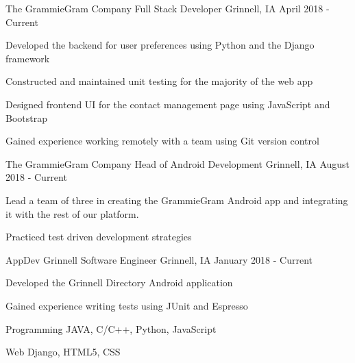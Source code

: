 \documentclass[11pt, a4paper]{awesome-cv}
\begin{document}
\begin{cventries}
  \cventry
    {The GrammieGram Company}
    {Full Stack Developer}
    {Grinnell, IA}
    {April 2018 - Current}
    {
      \begin{cvitems}
        \item {Developed the backend for user preferences using Python and the Django framework}
        \item {Constructed and maintained unit testing for the majority of the web app}
        \item {Designed frontend UI for the contact management page using JavaScript and Bootstrap}
        \item {Gained experience working remotely with a team using Git version control}
      \end{cvitems}
    }

  \cventry
    {The GrammieGram Company}
    {Head of Android Development}
    {Grinnell, IA}
    {August 2018 - Current}
    {
      \begin{cvitems}
        \item {Lead a team of three in creating the GrammieGram Android app and integrating it with the rest of our platform.}
	\item {Practiced test driven development strategies}
      \end{cvitems}
    }

  \cventry
    {AppDev Grinnell}
    {Software Engineer}
    {Grinnell, IA}
    {January 2018 - Current}
    {
      \begin{cvitems}
        \item {Developed the Grinnell Directory Android application}
	\item {Gained experience writing tests using JUnit and Espresso}
      \end{cvitems}
    }

\end{cventries}


\begin{cvskills}
  \cvskill
    {Programming} %
    {JAVA, C/C++, Python, JavaScript} %

  \cvskill
    {Web} %
    {Django, HTML5, CSS} %
\end{cvskills}
\end{document}
